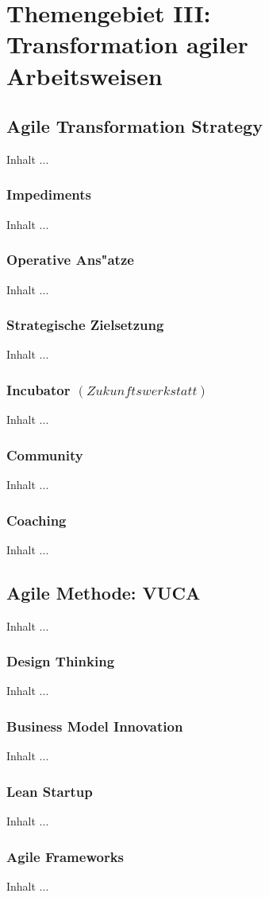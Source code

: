 
\chapter{Themengebiet III: \\Transformation agiler Arbeitsweisen}
\minitoc 
\vspace{1 cm} 

\section{Agile Transformation Strategy}
Inhalt ...

\subsection{Impediments}
Inhalt ...

\subsection{Operative Ans"atze}
Inhalt ...

\subsection{Strategische Zielsetzung}
Inhalt ...

\subsection{Incubator $(Zukunftswerkstatt)$}
Inhalt ...

\subsection{Community}
Inhalt ...

\subsection{Coaching}
Inhalt ...


\section{Agile Methode: VUCA}
Inhalt ...

\subsection{Design Thinking}
Inhalt ...

\subsection{Business Model Innovation}
Inhalt ...

\subsection{Lean Startup}
Inhalt ...

\subsection{Agile Frameworks}
Inhalt ...

